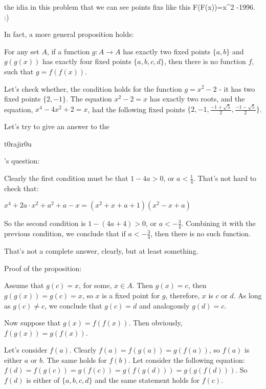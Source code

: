 \begin{solution}
	the  idia in this problem that we can see points fixs like this F(F(x))=x^2 -1996. :)
\end{solution}



\begin{solution}
	In fact, a more general proposition holds:

For any set $ A$, if a function $ g: A\rightarrow A$ has exactly two fixed points $ \{a,b\}$ and $ g(g(x))$ has exactly four fixed points $ \{a,b,c,d\}$, then there is no function $ f$, such that $ g = f(f(x))$.

Let's check whether, the condition holds for the function $ g = x^2 -2$ - it has two fixed points $ \{2,-1\}$. The equation $ x^2-2=x$ has exactly two roots, and the equation, $ x^4-4x^2+2=x$, had the following fixed points $ \{2,-1,\frac{-1+\sqrt{5}}{2}, \frac{-1-\sqrt{5}}{2}\}$.

Let's try to give an answer to the \begin{bolded}t0rajir0u\end{bolded}'s question:

Clearly the first condition must be that $ 1-4a > 0$, or $ a<\frac{1}{4}$. That's not hard to check that:

$ x^4+2a\cdot x^2 + a^2 + a - x = (x^2+x+a+1)(x^2-x+a)$

So the second condition is $ 1-(4a+4)>0$, or $ a<-\frac{3}{4}$. Combining it with the previous condition, we conclude that if $ \boxed{a<-\frac{3}{4}}$, then there is no such function.

That's not a complete answer, clearly, but at least something.

\begin{bolded}Proof of the proposition:
\end{bolded}
Assume that $ g(c)=x$, for some, $ x\in A$. Then $ g(x)=c$,  then $ g(g(x))=g(c)=x$, so $ x$ is a fixed point for $ g$, therefore, $ x$ is $ c$ or $ d$. As long as $ g(c)\neq c$, we conclude that $ g(c)=d$ and analogously $ g(d)=c$.

Now suppose that $ g(x) = f(f(x))$. Then obviously, $ \boxed{f(g(x))=g(f(x))}$.

Let's consider $ f(a)$. Clearly $ f(a)=f(g(a))=g(f(a))$, so $ f(a)$ is either $ a$ or $ b$. The same holds for $ f(b)$. Let consider the following equation:
 $ f(d)=f(g(c))=g(f(c))=g(f(g(d)))=g(g(f(d)))$. So $ f(d)$ is either of $ \{a,b,c,d\}$ and the same statement holds for $ f(c)$.


\end{solution}
